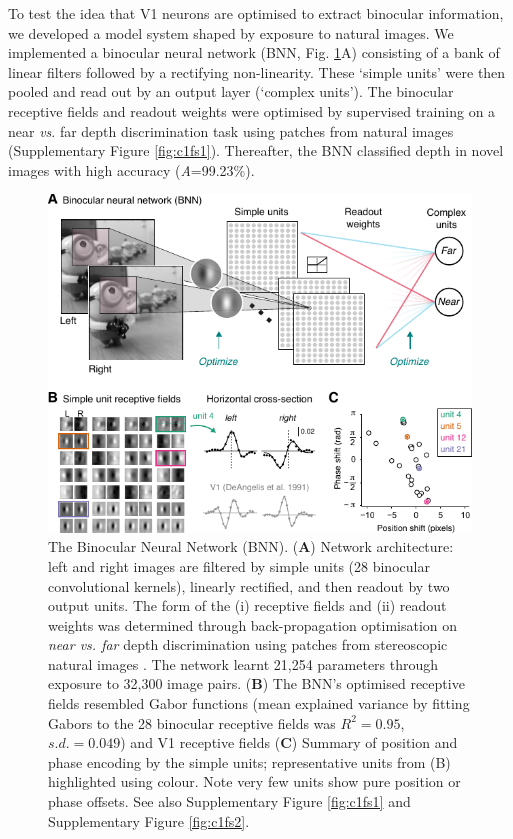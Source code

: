 {To test the idea that V1 neurons are optimised to extract binocular information, we developed a model system shaped by exposure to natural images. We implemented a binocular neural network (BNN, Fig. \ref{fig:c1f2}A) consisting of a bank of linear filters followed by a rectifying non-linearity. These `simple units' were then pooled and read out by an output layer (`complex units'). The binocular receptive fields and readout weights were optimised by supervised training on a near {\it vs}. far depth discrimination task using patches from natural images (Supplementary Figure \ref{fig:c1fs1}). Thereafter, the BNN classified depth in novel images with high accuracy ({\it A}=99.23\%). 

\begin{figure}[!h]
  \centering
  \includegraphics{chapter1/chapter1-figs/Fig2.pdf}
  \caption[The Binocular Neural Network.]{The Binocular Neural Network (BNN). ({\bf A}) Network architecture: left and right images are filtered by simple units (28 binocular convolutional kernels), linearly rectified, and then readout by two output units. The form of the (i) receptive fields and (ii) readout weights was determined through back-propagation optimisation on {\it near vs. far} depth discrimination using patches from stereoscopic natural images \cite{Li:2014ik}. The network learnt 21,254 parameters through exposure to 32,300 image pairs. ({\bf B}) The BNN's optimised receptive fields resembled Gabor functions (mean explained variance by fitting Gabors to the 28 binocular receptive fields was $R^2=0.95$, $s.d.=0.049$) and V1 receptive fields \cite{DeAngelis:1991mb} ({\bf C}) Summary of position and phase encoding by the simple units; representative units from (B) highlighted using colour. Note very few units show pure position or phase offsets. See also Supplementary Figure \ref{fig:c1fs1} and Supplementary Figure \ref{fig:c1fs2}.}
  \label{fig:c1f2}
\end{figure}


}
